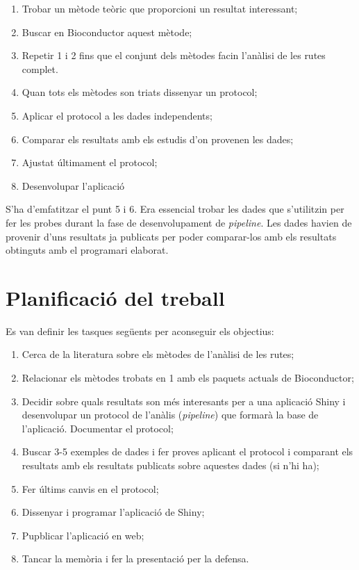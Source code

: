 \begin{enumerate}
\item Trobar un mètode teòric que proporcioni un resultat interessant;
\item Buscar en Bioconductor aquest mètode;
\item Repetir 1 i 2 fins que el conjunt dels mètodes facin l'anàlisi de les rutes complet. 
\item Quan tots els mètodes son triats dissenyar un protocol;
\item Aplicar el protocol a les dades independents;
\item Comparar els resultats amb els estudis d'on provenen les dades;
\item Ajustat últimament el protocol;
\item Desenvolupar l'aplicació
\end{enumerate}
 
S'ha d'emfatitzar el punt 5 i 6. Era essencial trobar les dades que s'utilitzin per fer les probes durant la fase de desenvolupament de \textit{pipeline}. Les dades havien de provenir d'uns resultats ja publicats per poder comparar-los amb els resultats obtinguts amb el programari elaborat. 

\section{Planificació del treball}

Es van definir les tasques següents per aconseguir els objectius:

\begin{enumerate}
\item Cerca de la literatura sobre els mètodes de l'anàlisi de les rutes;
\item Relacionar els mètodes trobats en 1 amb els paquets actuals de Bioconductor;
\item Decidir sobre quals resultats son més interesants per a una aplicació Shiny i desenvolupar un protocol de l'anàlis (\textit{pipeline}) que formarà la base de l'aplicació. Documentar el protocol;
\item Buscar 3-5 exemples de dades i fer proves aplicant el protocol i comparant els resultats amb els resultats publicats sobre aquestes dades (si n'hi ha);
\item Fer últims canvis en el protocol;
\item Dissenyar i programar l'aplicació de Shiny;
\item Pupblicar l'aplicació en web;
\item Tancar la memòria i fer la presentació per la defensa.
\end{enumerate}

